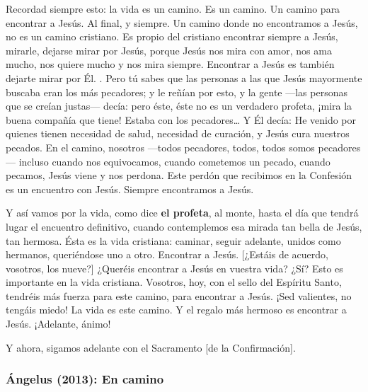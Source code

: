 \begin{body}
	Recordad siempre esto: la vida es un camino. Es un camino. Un camino para encontrar a Jesús. Al final, y siempre. Un camino donde no encontramos a Jesús, no es un camino cristiano. Es propio del cristiano encontrar siempre a Jesús, mirarle, dejarse mirar por Jesús, porque Jesús nos mira con amor, nos ama mucho, nos quiere mucho y nos mira siempre. Encontrar a Jesús es también dejarte mirar por Él. . Pero tú sabes que las personas a las que Jesús mayormente buscaba eran los más pecadores; y le reñían por esto, y la gente ---las personas que se creían justas--- decía: pero éste, éste no es un verdadero profeta, ¡mira la buena compañía que tiene! Estaba con los pecadores\ldots{} Y Él decía: He venido por quienes tienen necesidad de salud, necesidad de curación, y Jesús cura nuestros pecados. En el camino, nosotros ---todos pecadores, todos, todos somos pecadores--- incluso cuando nos equivocamos, cuando cometemos un pecado, cuando pecamos, Jesús viene y nos perdona. Este perdón que recibimos en la Confesión es un encuentro con Jesús. Siempre encontramos a Jesús. 
	
	Y así vamos por la vida, como dice \textbf{el profeta}, al monte, hasta el día que tendrá lugar el encuentro definitivo, cuando contemplemos esa mirada tan bella de Jesús, tan hermosa. Ésta es la vida cristiana: caminar, seguir adelante, unidos como hermanos, queriéndose uno a otro. Encontrar a Jesús. {[}¿Estáis de acuerdo, vosotros, los nueve?{]} ¿Queréis encontrar a Jesús en vuestra vida? ¿Sí? Esto es importante en la vida cristiana. Vosotros, hoy, con el sello del Espíritu Santo, tendréis más fuerza para este camino, para encontrar a Jesús. ¡Sed valientes, no tengáis miedo! La vida es este camino. Y el regalo más hermoso es encontrar a Jesús. ¡Adelante, ánimo! 
	
	Y ahora, sigamos adelante con el Sacramento {[}de la Confirmación{]}.
\end{body}

\newpage
\subsubsection{Ángelus (2013): En camino}


